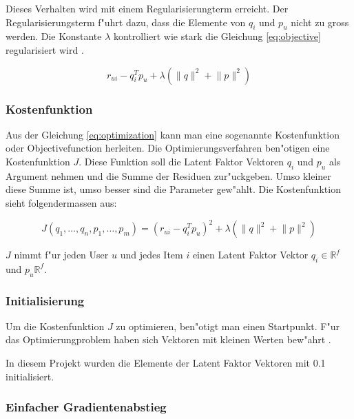 \documentclass[a4paper, 12pt]{article}
\begin{document}
 Dieses Verhalten wird mit einem Regularisierungterm erreicht. Der Regularisierungsterm f"uhrt dazu, dass die Elemente von $q_i$ und $p_u$ nicht zu gross werden. Die Konstante $\lambda$ kontrolliert wie stark die Gleichung \ref{eq:objective} regularisiert wird \cite{koren2009}.

\begin{equation}
  \label{eq:optimization}
    r_{ui} - q_i^T p_u + \lambda (\lVert q \rVert^2 + \lVert p \lVert ^2)
\end{equation}

\subsubsection{Kostenfunktion}
\label{sec:opt}

Aus der Gleichung \ref{eq:optimization} kann man eine sogenannte Kostenfunktion oder Objectivefunction herleiten. Die Optimierungsverfahren ben"otigen eine Kostenfunktion $J$. Diese Funktion soll die Latent Faktor Vektoren $q_i$ und $p_u$ als Argument nehmen und die Summe der Residuen zur"uckgeben. Umso kleiner diese Summe ist, umso besser sind die Parameter gew"ahlt. Die Kostenfunktion sieht folgendermassen aus:

\begin{equation}
  \label{eq:costfunction}
  J(q_1, \dots , q_n, p_1, \dots, p_m) =  (r_{ui} - q_i^T p_u)^2 + \lambda (\lVert q \rVert^2 + \lVert p \lVert ^2)
\end{equation}

$J$ nimmt f"ur jeden User $u$ und jedes Item $i$ einen Latent Faktor Vektor $q_i \in \mathbb{R}^f$ und $p_u \mathbb{R}^f$.

\subsubsection{Initialisierung}
\label{sec:init}

Um die Kostenfunktion $J$ zu optimieren, ben"otigt man einen Startpunkt. F"ur das Optimierungproblem \label{eq:objective} haben sich Vektoren mit kleinen Werten bew"ahrt \cite{Takacs08}. 

In diesem Projekt wurden die Elemente der Latent Faktor Vektoren mit 0.1 initialisiert.

\subsubsection{Einfacher Gradientenabstieg}
\label{sec:gradientdescent}
 
\end{document}
